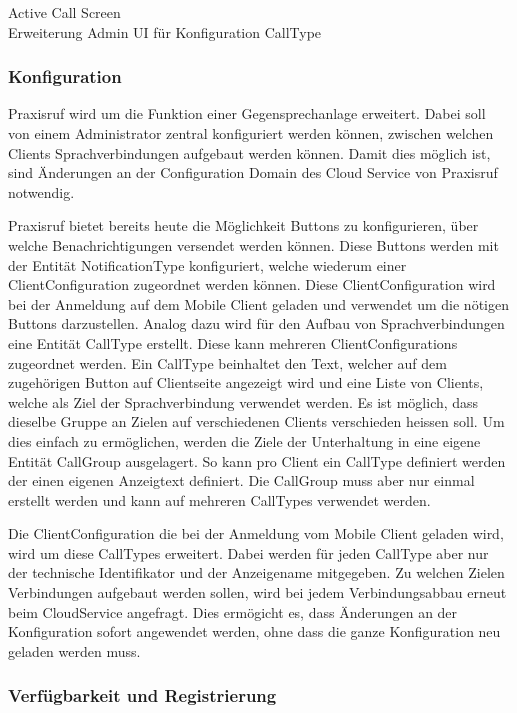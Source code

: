 Active Call Screen \\
Erweiterung Admin UI für Konfiguration CallType \\

\clearpage
\subsubsection*{Konfiguration}

Praxisruf wird um die Funktion einer Gegensprechanlage erweitert.
Dabei soll von einem Administrator zentral konfiguriert werden können, zwischen welchen Clients Sprachverbindungen
aufgebaut werden können.
Damit dies möglich ist, sind Änderungen an der Configuration Domain des Cloud Service von Praxisruf notwendig.

Praxisruf bietet bereits heute die Möglichkeit Buttons zu konfigurieren, über welche Benachrichtigungen versendet werden können.
Diese Buttons werden mit der Entität NotificationType konfiguriert, welche wiederum einer ClientConfiguration zugeordnet werden können.
Diese ClientConfiguration wird bei der Anmeldung auf dem Mobile Client geladen und verwendet um die nötigen Buttons darzustellen.
Analog dazu wird für den Aufbau von Sprachverbindungen eine Entität CallType erstellt.
Diese kann mehreren ClientConfigurations zugeordnet werden.
Ein CallType beinhaltet den Text, welcher auf dem zugehörigen Button auf Clientseite angezeigt wird und eine Liste von
Clients, welche als Ziel der Sprachverbindung verwendet werden.
Es ist möglich, dass dieselbe Gruppe an Zielen auf verschiedenen Clients verschieden heissen soll.
Um dies einfach zu ermöglichen, werden die Ziele der Unterhaltung in eine eigene Entität CallGroup ausgelagert.
So kann pro Client ein CallType definiert werden der einen eigenen Anzeigtext definiert.
Die CallGroup muss aber nur einmal erstellt werden und kann auf mehreren CallTypes verwendet werden.

Die ClientConfiguration die bei der Anmeldung vom Mobile Client geladen wird, wird um diese CallTypes erweitert.
Dabei werden für jeden CallType aber nur der technische Identifikator und der Anzeigename mitgegeben.
Zu welchen Zielen Verbindungen aufgebaut werden sollen, wird bei jedem Verbindungsabbau erneut beim CloudService angefragt.
Dies ermögicht es, dass Änderungen an der Konfiguration sofort angewendet werden, ohne dass die ganze Konfiguration neu geladen werden muss.

\clearpage
\subsubsection*{Verfügbarkeit und Registrierung}

